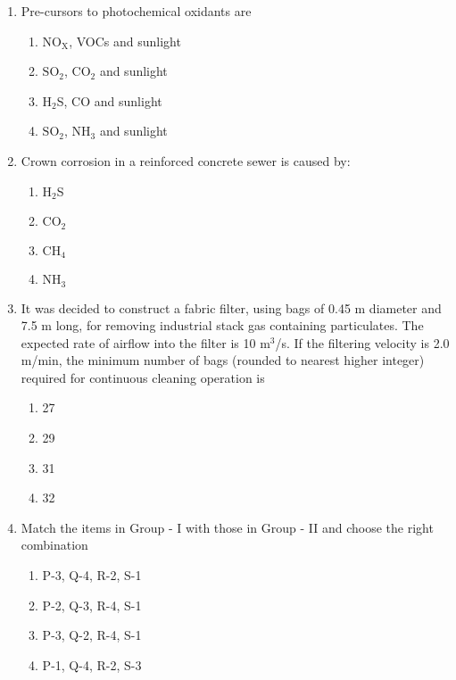 \documentclass[journal]{IEEEtran}
\begin{document}
\begin{enumerate}
\item Pre-cursors to photochemical oxidants are
\begin{enumerate}
    \item $\text{NO}_\text{X}$, VOCs and sunlight
\item $\text{SO}_2$, $\text{CO}_2$ and sunlight
\item $\text{H}_2$S, CO and sunlight
\item $\text{SO}_2$, $\text{NH}_3$ and sunlight \\
\end{enumerate}
\item Crown corrosion in a reinforced concrete sewer is caused by:
\begin{enumerate}
    \item $\text{H}_2$S
    \item $\text{CO}_2$
    \item $\text{CH}_4$
    \item $\text{NH}_3$ \\
\end{enumerate}
\item It was decided to construct a fabric filter, using bags of 0.45 m diameter and 7.5 m long, for removing industrial stack gas containing particulates. The expected rate of airflow into the filter is 10 $\text{m}^3$/s. If the filtering velocity is 2.0 m/min, the minimum number of bags (rounded to nearest higher integer) required for continuous cleaning operation is 
\begin{enumerate}
    \item 27
    \item 29
    \item 31
    \item 32 \\
\end{enumerate}
\item Match the items in Group - I with those in Group - II and choose the right combination
\begin{table}[h!]
  \centering
  
\end{table}
\begin{enumerate}
    \item P-3, Q-4, R-2, S-1 
    \item P-2, Q-3, R-4, S-1
    \item P-3, Q-2, R-4, S-1 
    \item P-1, Q-4, R-2, S-3 \\

\end{enumerate}
\end{enumerate}
\end{document}
